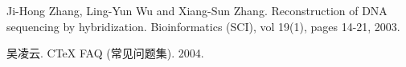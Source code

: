 
\begin{publications}{99}

\item Ji-Hong Zhang, Ling-Yun Wu and Xiang-Sun Zhang.
  Reconstruction of DNA sequencing by hybridization.
  Bioinformatics (SCI), vol 19(1), pages 14-21, 2003.

\item 吴凌云.
  C\TeX{} FAQ (常见问题集).
  2004.

\end{publications}
